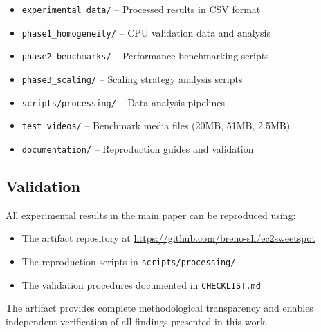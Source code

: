 \documentclass[conference]{IEEEtran}
\begin{document}
\begin{itemize}
	\item \texttt{experimental\_data/} -- Processed results in CSV format
	\item \texttt{phase1\_homogeneity/} -- CPU validation data and analysis  
	\item \texttt{phase2\_benchmarks/} -- Performance benchmarking scripts
	\item \texttt{phase3\_scaling/} -- Scaling strategy analysis scripts
	\item \texttt{scripts/processing/} -- Data analysis pipelines
	\item \texttt{test\_videos/} -- Benchmark media files (20MB, 51MB, 2.5MB)
	\item \texttt{documentation/} -- Reproduction guides and validation
\end{itemize}

\subsection{Validation}

All experimental results in the main paper can be reproduced using:
\begin{itemize}
	\item The artifact repository at \url{https://github.com/breno-sh/ec2sweetspot}
	\item The reproduction scripts in \texttt{scripts/processing/}
	\item The validation procedures documented in \texttt{CHECKLIST.md}
\end{itemize}

The artifact provides complete methodological transparency and enables independent verification of all findings presented in this work.
	
\end{document}
